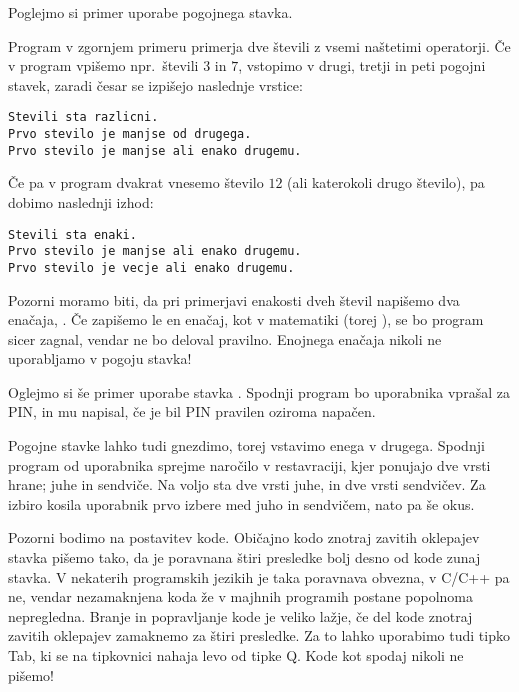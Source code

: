 Poglejmo si primer uporabe pogojnega stavka.


Program v zgornjem primeru primerja dve števili z vsemi naštetimi operatorji.
Če v program vpišemo npr.~števili $3$ in $7$, vstopimo v drugi, tretji in peti
pogojni stavek, zaradi česar se izpišejo naslednje vrstice:
%
\begin{verbatim}
Stevili sta razlicni.
Prvo stevilo je manjse od drugega.
Prvo stevilo je manjse ali enako drugemu.
\end{verbatim}
%
Če pa v program dvakrat vnesemo število $12$ (ali katerokoli drugo število), pa
dobimo naslednji izhod:
%
\begin{verbatim}
Stevili sta enaki.
Prvo stevilo je manjse ali enako drugemu.
Prvo stevilo je vecje ali enako drugemu.
\end{verbatim}

Pozorni moramo biti, da pri primerjavi enakosti dveh števil napišemo dva
enačaja, \koda{==}.
Če zapišemo le en enačaj, kot v matematiki (torej \koda{=}), se bo program sicer
zagnal, vendar ne bo deloval pravilno.
Enojnega enačaja nikoli ne uporabljamo v pogoju  stavka!

Oglejmo si še primer uporabe stavka .
Spodnji program bo uporabnika vprašal za PIN, in mu napisal, če je bil PIN
pravilen oziroma napačen.


Pogojne stavke lahko tudi gnezdimo, torej vstavimo enega v drugega.
Spodnji program od uporabnika sprejme naročilo v restavraciji, kjer ponujajo
dve vrsti hrane; juhe in sendviče.
Na voljo sta dve vrsti juhe, in dve vrsti sendvičev.
Za izbiro kosila uporabnik prvo izbere med juho in sendvičem, nato pa še okus.


Pozorni bodimo na postavitev kode.
Običajno kodo znotraj zavitih oklepajev  stavka pišemo tako, da je
poravnana štiri presledke bolj desno od kode zunaj  stavka.
V nekaterih programskih jezikih je taka poravnava obvezna, v C/C++ pa ne, vendar
nezamaknjena koda že v majhnih programih postane popolnoma nepregledna.
Branje in popravljanje kode je veliko lažje, če del kode znotraj zavitih
oklepajev zamaknemo za štiri presledke.
Za to lahko uporabimo tudi tipko Tab, ki se na tipkovnici nahaja levo od tipke
Q.
Kode kot spodaj nikoli ne pišemo!


